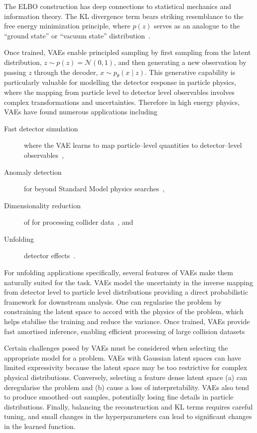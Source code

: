         The ELBO construction has deep connections to statistical mechanics and information theory.
        The KL divergence term bears striking resemblance to the free energy minimization principle, where \(p(z)\) serves as an analogue to the ``ground state'' or ``vacuum state'' distribution~\cite{bilionis_free_2012}.

        Once trained, VAEs enable principled sampling by first sampling from the latent distribution, \(z \sim p(z) = \mathcal{N}(0, 1)\), and then generating a new observation by passing \(z\) through the decoder, \(x \sim p_{\theta}(x\mid z)\).
        This generative capability is particularly valuable for modelling the detector response in particle physics, where the mapping from particle level to detector level observables involves complex transformations and uncertainties.
        Therefore in high energy physics, VAEs have found numerous applications including
        \begin{description}
            \item[Fast detector simulation] where the VAE learns to map particle--level quantities to detector--level observables~\cite{Darulis2022MachineSimulations, hashemi_deep_2024},
            \item[Anomaly detection] for beyond Standard Model physics searches~\cite{liu_fast_2023},
            \item[Dimensionality reduction] of for processing collider data~\cite{yue_autoencoders_2024}, and
            \item[Unfolding] detector effects~\cite{erdmann_autoencoder-extended_2023}.
        \end{description}
        
        For unfolding applications specifically, several features of VAEs make them naturally suited for the task.
        VAEs model the uncertainty in the inverse mapping from detector level to particle level distributions providing a direct probabilistic framework for downstream analysis.
        One can regularise the problem by constraining the latent space to accord with the physics of the problem, which helps stabilise the training and reduce the variance.
        Once trained, VAEs provide fast amortised inference, enabling efficient processing of large collision datasets

        Certain challenges posed by VAEs must be considered when selecting the appropriate model for a problem.
        VAEs with Gaussian latent spaces can have limited expressivity because the latent space may be too restrictive for complex physical distributions.
        Conversely, selecting a feature dense latent space (a) can deregularise the problem and (b) cause a loss of interpretability.
        VAEs also tend to produce smoothed--out samples, potentially losing fine details in particle distributions.
        Finally, balancing the reconstruction and KL terms requires careful tuning, and small changes in the hyperparameters can lead to significant changes in the learned function.

